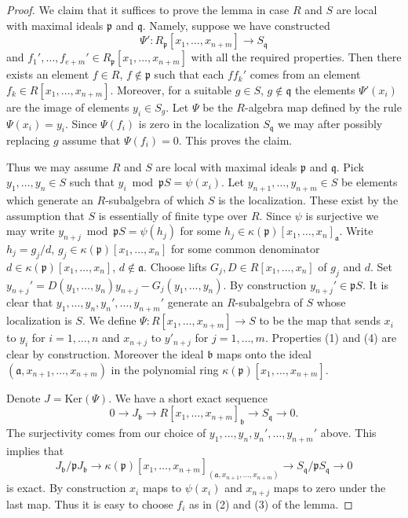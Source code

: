 \begin{proof}
We claim that it suffices to prove the lemma in case $R$
and $S$ are local with maximal ideals $\mathfrak p$ and $\mathfrak q$.
Namely, suppose we have constructed
$$
\Psi' : R_{\mathfrak p}[x_1, \ldots, x_{n + m}]
\longrightarrow
S_{\mathfrak q}
$$
and $f_1', \ldots, f_{e + m}' \in R_{\mathfrak p}[x_1, \ldots, x_{n + m}]$
with all the required properties. Then there exists an element
$f \in R$, $f \not \in \mathfrak p$ such that each
$ff_k'$ comes from an element $f_k \in R[x_1, \ldots, x_{n + m}]$.
Moreover, for a suitable $g \in S$, $g \not \in \mathfrak q$
the elements $\Psi'(x_i)$ are the image of elements
$y_i \in S_g$. Let $\Psi$ be the $R$-algebra map defined
by the rule $\Psi(x_i) = y_i$. Since $\Psi(f_i)$ is zero
in the localization $S_{\mathfrak q}$ we may after possibly
replacing $g$ assume that $\Psi(f_i) = 0$. This proves the claim.

\medskip\noindent
Thus we may assume $R$ and $S$ are local
with maximal ideals $\mathfrak p$ and $\mathfrak q$.
Pick $y_1, \ldots, y_n \in S$ such that
$y_i \bmod \mathfrak pS = \psi(x_i)$.
Let $y_{n + 1}, \ldots, y_{n + m} \in S$ be elements which generate
an $R$-subalgebra of which $S$ is the localization.
These exist by the assumption that $S$ is essentially of
finite type over $R$. Since $\psi$ is surjective we
may write $y_{n + j} \bmod \mathfrak pS = \psi(h_j)$ for
some $h_j \in \kappa(\mathfrak p)[x_1, \ldots, x_n]_{\mathfrak a}$.
Write $h_j = g_j/d$, $g_j \in \kappa(\mathfrak p)[x_1, \ldots, x_n]$
for some common denominator $d \in \kappa(\mathfrak p)[x_1, \ldots, x_n]$,
$d \not \in \mathfrak a$. Choose lifts $G_j, D \in R[x_1, \ldots, x_n]$
of $g_j$ and $d$. Set
$y_{n + j}' = D(y_1, \ldots, y_n) y_{n + j} - G_j(y_1, \ldots, y_n)$.
By construction $y_{n + j}' \in \mathfrak p S$.
It is clear that $y_1, \ldots, y_n, y_n', \ldots, y_{n + m}'$
generate an $R$-subalgebra of $S$ whose localization is $S$.
We define $\Psi : R[x_1, \ldots, x_{n + m}] \to S$ to be
the map that sends $x_i$ to $y_i$ for $i = 1, \ldots, n$
and $x_{n + j}$ to $y'_{n + j}$ for $j = 1, \ldots, m$. Properties
(1) and (4) are clear by construction. Moreover the ideal
$\mathfrak b$ maps onto the ideal
$(\mathfrak a, x_{n + 1}, \ldots, x_{n + m})$
in the polynomial ring $\kappa(\mathfrak p)[x_1, \ldots, x_{n + m}]$.

\medskip\noindent
Denote $J = \text{Ker}(\Psi)$. We have a short exact sequence
$$
0 \to J_{\mathfrak b}
\to R[x_1, \ldots, x_{n + m}]_{\mathfrak b}
\to S_{\mathfrak q}
\to 0.
$$
The surjectivity comes from our choice of
$y_1, \ldots, y_n, y_n', \ldots, y_{n + m}'$ above.
This implies that
$$
J_{\mathfrak b}/ \mathfrak pJ_{\mathfrak b}
\to \kappa(\mathfrak p)[x_1, \ldots, x_{n + m}]_{
(\mathfrak a, x_{n + 1}, \ldots, x_{n + m})}
\to S_{\mathfrak q}/\mathfrak pS_{\mathfrak q}
\to 0
$$
is exact. By construction $x_i$ maps to $\psi(x_i)$ and
$x_{n + j}$ maps to zero under the last map.
Thus it is easy to choose $f_i$ as in
(2) and (3) of the lemma.
\end{proof}

